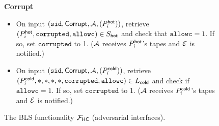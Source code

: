 \begin{figure*}
{{    \textbf{Corrupt}
    \begin{itemize}
        \item On input $(\texttt{sid},\mathsf{Corrupt}, \mathcal{A}, (P_i^{\mathsf{hot}}))$, retrieve $(P_i^{\mathsf{hot}}, \texttt{corrupted}, \texttt{allowc}) \in S_{\mathsf{hot}}$ and check that $\texttt{allowc}=1$. If so, set $\texttt{corrupted}$ to 1. ($\mathcal{A}$ receives $P_i^{\mathsf{hot}}$'s tapes and $\mathcal{E}$ is notified.)
        \item On input $(\texttt{sid},\mathsf{Corrupt}, \mathcal{A}, (P_i^{\mathsf{cold}}))$, retrieve $(P_i^{\mathsf{cold}}, *, *, *, *, \texttt{corrupted}, \texttt{allowc}) \in L_{\mathsf{cold}}$ and check if $\texttt{allowc}=1$. If so, set $\texttt{corrupted}$ to 1. ($\mathcal{A}$ receives $P_i^{\mathsf{cold}}$'s tapes and $\mathcal{E}$ is notified.)
    \end{itemize}
    }}
        \caption{The BLS \hcwl functionality $\mathcal{F}_\mathsf{HC}$ (adversarial interfaces).}
        \label{fig:FSign3}
    \end{figure*}
